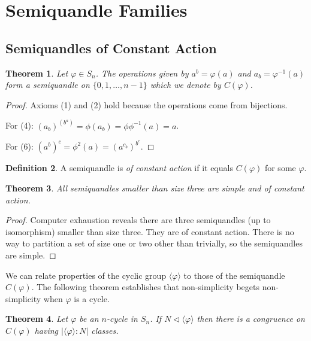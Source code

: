 \documentclass{amsart}
\newtheorem{thm}{Theorem}[section]
\theoremstyle{definition}
\newtheorem{definition}[thm]{Definition}
\numberwithin{equation}{section}
\begin{document}
\section{Semiquandle Families}

\subsection{Semiquandles of Constant Action}

\begin{thm}
Let $\varphi \in S_n$. The operations given by $a^{b} = \varphi(a)$
and $a_b = \varphi^{-1}(a)$ form a semiquandle on $\{0, 1, \ldots,
n-1\}$ which we denote by $C(\varphi)$.
\end{thm}

\begin{proof}
  Axioms (1) and (2) hold because the operations come from bijections.

For (4): $(a_b)^{(b^a)} = \phi(a_b) = \phi \phi^{-1}(a) = a$.

For (6): $(a^b)^c = \phi^{2}(a) = (a^{c_b})^{b^c}$.
\end{proof}

\begin{definition}
A semiquandle is \emph{of constant action} if it equals $C(\varphi)$
for some $\varphi$.
\end{definition}

\begin{thm}
All semiquandles smaller than size three are simple and of constant
action.
\end{thm}

\begin{proof}
Computer exhaustion reveals there are three semiquandles (up to
isomorphism) smaller than size three. They are of constant action.
There is no way to partition a set of size one or two other than
trivially, so the semiquandles are simple.
\end{proof}

We can relate properties of the cyclic group $\langle\varphi\rangle$
to those of the semiquandle $C(\varphi)$.  The following theorem
establishes that non-simplicity begets non-simplicity when $\varphi$
is a cycle.

\begin{thm}
Let $\varphi$ be an $n$-cycle in $S_n$. If $N \lhd \langle\varphi\rangle$
then there is a congruence on $C(\varphi)$ having
$\left|\langle\varphi\rangle : N\right|$ classes.
\end{thm}
\end{document}
